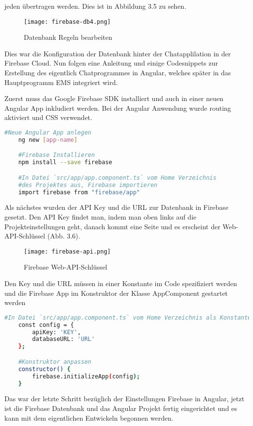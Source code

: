 jeden übertragen werden. Dies ist in Abbildung 3.5 zu sehen.
\begin{center}
    \begin{figure}[H]
        \centering
        \texttt{[image: firebase-db4.png]}
        \caption{Datenbank Regeln bearbeiten}
    \end{figure}
\end{center}
Dies war die Konfiguration der Datenbank hinter der Chatapplilation in der Firebase Cloud. Nun folgen eine Anleitung und einige Codesnippets zur Erstellung des eigentlich Chatprogrammes in Angular, welches später in das Hauptprogramm
EMS integriert wird.

Zuerst muss das Google Firebase SDK installiert und auch in einer neuen Angular App inkludiert werden. Bei der Angular Anwendung wurde routing aktiviert und CSS verwendet.
\begin{lstlisting}[language=bash]
    #Neue Angular App anlegen
    ng new [app-name]

    #Firebase Installieren
    npm install --save firebase

    #In Datei `src/app/app.component.ts` vom Home Verzeichnis 
    #des Projektes aus, Firebase importieren
    import firebase from "firebase/app"
\end{lstlisting}

Als nächstes wurden der API Key und die URL zur Datenbank in Firebase gesetzt. Den API Key findet man, indem man oben links auf die Projekteinstellungen geht, danach kommt eine Seite und es erscheint der Web-API-Schlüssel (Abb. 3.6).
\begin{center}
    \begin{figure}[H]
        \centering
        \texttt{[image: firebase-api.png]}
        \caption{Firebase Web-API-Schlüssel}
    \end{figure}
\end{center}
Den Key und die URL müssen in einer Konstante im Code spezifiziert werden und die Firebase App im Konstruktor der Klasse AppComponent gestartet werden
\begin{lstlisting}[language=bash]
    #In Datei `src/app/app.component.ts` vom Home Verzeichnis als Konstante zu definieren
    const config = {
        apiKey: 'KEY',
        databaseURL: 'URL'
    };

    #Konstruktor anpassen
    constructor() {
        firebase.initializeApp(config);
    }
\end{lstlisting}
Das war der letzte Schritt bezüglich der Einstellungen Firebase in Angular, jetzt ist die Firebase Datenbank und das Angular Projekt fertig eingerichtet und es kann mit dem eigentlichen Entwickeln begonnen werden.

